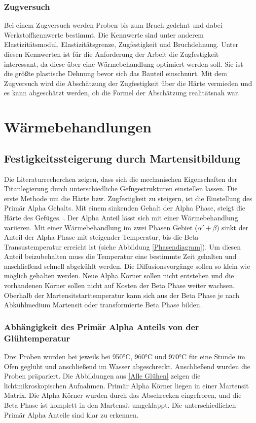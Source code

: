 \documentclass[a4paper, 11pt]{tubsreprt}
\begin{document}
\subsection{Zugversuch}

Bei einem Zugversuch werden Proben bis zum Bruch gedehnt und dabei Werkstoffkennwerte bestimmt. Die Kennwerte sind unter anderem  Elastizitätsmodul, Elastizitätsgrenze, Zugfestigkeit und Bruchdehnung. Unter diesen Kennwerten ist für die Anforderung der Arbeit die Zugfestigkeit interessant, da diese über eine Wärmebehandlung optimiert werden soll. Sie ist die größte plastische Dehnung bevor sich das Bauteil einschnürt. Mit dem Zugversuch wird die Abschätzung der Zugfestigkeit über die Härte vermieden und es kann abgeschätzt werden, ob die Formel der Abschätzung realitätsnah war. 

\chapter{Wärmebehandlungen}
\section{Festigkeitssteigerung durch Martensitbildung}
Die Literaturrecherchen zeigen, dass sich die mechanischen Eigenschaften der Titanlegierung durch unterschiedliche Gefügestrukturen einstellen lassen. Die erste Methode um die Härte bzw. Zugfestigkeit zu steigern, ist die Einstellung des Primär Alpha Gehalts. Mit einem sinkenden Gehalt der Alpha Phase, steigt die Härte des Gefüges. \cite{Sahoo2015}. Der Alpha Anteil lässt sich mit einer Wärmebehandlung variieren. 
Mit einer Wärmebehandlung im zwei Phasen Gebiet ($\alpha'+ \beta$) sinkt der Anteil der Alpha Phase mit steigender Temperatur, bis die Beta Transustemperatur erreicht ist (siehe Abbildung \ref{Phasendiagram}). Um diesen Anteil beizubehalten muss die Temperatur eine bestimmte Zeit gehalten und anschließend schnell abgekühlt werden. Die Diffusionsvorgänge sollen so klein wie möglich gehalten werden. Neue Alpha Körner sollen nicht entstehen und die vorhandenen Körner sollen nicht auf Kosten der Beta Phase weiter wachsen. Oberhalb der Martensitstarttemperatur kann sich aus der Beta Phase je nach Abkühlmedium Martensit oder transformierte Beta Phase bilden.

\subsection{Abhängigkeit des Primär Alpha Anteils von der Glühtemperatur}
Drei Proben wurden bei jeweils bei 950°C, 960°C und 970°C für eine Stunde im Ofen geglüht und anschließend im Wasser abgeschreckt. Anschließend wurden die Proben präpariert. Die Abbildungen aus \ref{Alle Glühen} zeigen die lichtmikroskopischen Aufnahmen. Primär Alpha Körner liegen in einer Martensit Matrix. Die Alpha Körner wurden durch das Abschrecken eingefroren, und die Beta Phase ist komplett in den Martensit umgeklappt. Die unterschiedlichen Primär Alpha Anteile sind klar zu erkennen.
\end{document}
